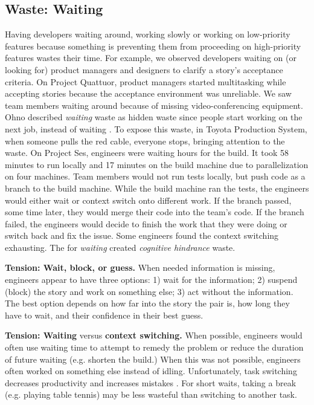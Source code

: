 \subsection{Waste: Waiting}
Having developers waiting around, working slowly or working on low-priority features because something is preventing them from proceeding on high-priority features wastes their time. For example, we observed developers waiting on (or looking for) product managers and designers to clarify a story's acceptance criteria. On Project Quattuor, product managers started multitasking while accepting stories because the acceptance environment was unreliable. We saw team members waiting around because of missing video-conferencing equipment. 
Ohno described \textit{waiting} waste as hidden waste since people start working on the next job, instead of waiting \cite{OhnoToyotaProductionSystem}. To expose this waste, in Toyota Production System, when someone pulls the red cable, everyone stops, bringing attention to the waste. On Project Ses, engineers were waiting hours for the build. It took 58 minutes to run locally and 17 minutes on the build machine due to parallelization on four machines. Team members would not run tests locally, but push code as a branch to the build machine. While the build machine ran the tests, the engineers would either wait or context switch onto different work. If the branch passed, some time later, they would merge their code into the team's code. If the branch failed, the engineers would decide to finish the work that they were doing or switch back and fix the issue. Some engineers found the context switching exhausting. The  for \textit{waiting} created \textit{cognitive hindrance} waste.


\textbf{Tension: Wait, block, or guess.}
When needed information is missing, engineers appear to have three options: 1) wait for the information; 2) suspend (block) the story and work on something else; 3) act without the information. The best option depends on how far into the story the pair is, how long they have to wait, and their confidence in their best guess.


\textbf{Tension: Waiting} versus \textbf{context switching.}
When possible, engineers would often use waiting time to attempt to remedy the problem or reduce the duration of future waiting (e.g. shorten the build.) When this was not possible, engineers often worked on something else instead of idling. Unfortunately, task switching decreases productivity and increases mistakes \cite{MonsellTaskSwitching}. For short waits, taking a break (e.g. playing table tennis) may be less wasteful than switching to another task. 


